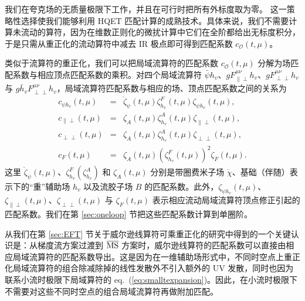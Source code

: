 我们在夸克场的无质量极限下工作，并且在可行时把所有外标度取为零。
这一策略性选择使我们能够利用 HQET 匹配计算的成熟技术。具体来说，我们不需要计算未流动的算符，因为在维数正则化的微扰计算中它们在全阶都给出无标度积分，于是只需从重正化的流动算符中减去 IR 极点即可得到匹配系数 $c_{\mathcal{O}}(t, \mu)$。

类似于流算符的重正化，我们可以把局域流算符的匹配系数 $c_{\mathcal{O}}(t, \mu)$ 分解为场匹配系数与相应顶点匹配系数的乘积。对四个局域流算符 $\bar{\psi} h_v$、$gF^{\mu\nu}_{\|\perp}h_v$、$gF^{\mu\nu}_{\perp\perp}h_v$ 与 $g\bar{h}_vF^{\mu\nu}_{\perp\perp}h_v$，局域流算符匹配系数与相应的场、顶点匹配系数之间的关系为
\begin{subequations}
\label{eq:operatorrelations}
\begin{eqnarray}
c_{\psi h_v} (t,\mu) &=& \mathring{\zeta}_{\psi}(t,\mu)\zeta_{h_v}^F(t,\mu)\zeta_{\psi h_v}(t,\mu),\\
c_{\|\perp} (t,\mu)&=& \zeta_{A}(t,\mu)\zeta_{h_v}^A(t,\mu)\zeta_{\|\perp}(t,\mu),\\
c_{\perp\perp}(t,\mu) &=& \zeta_{A}(t,\mu)\zeta_{h_v}^A(t,\mu)\zeta_{\perp\perp}(t,\mu),\\
c_F(t,\mu) &=& \zeta_{A}(t,\mu)(\zeta^F_{h_v}(t,\mu))^2\zeta_F(t,\mu).
\end{eqnarray}
\end{subequations}
这里 $\mathring{\zeta}_{\psi}(t,\mu)$、$\zeta_{h_v}^F (\zeta_{h_v}^A)$ 和 $\zeta_{A}(t,\mu)$ 分别是带圈费米子场 $\mathring{\chi}$、基础（伴随）表示下的``重''辅助场 $h_v$ 以及流胶子场 $B$ 的匹配系数。此外，$\zeta_{\psi h_v}(t,\mu)$、$\zeta_{\|\perp}(t,\mu)$、$\zeta_{\perp\perp}(t,\mu)$ 与 $\zeta_F(t,\mu)$ 表示相应流动局域流算符顶点修正引起的匹配系数。我们在第 \ref{sec:oneloop} 节把这些匹配系数计算到单圈阶。

从我们在第 \ref{sec:EFT} 节关于威尔逊线算符可乘重正化的研究中得到的一个关键认识是：从梯度流方案过渡到 $\overline{\rm MS}$ 方案时，威尔逊线算符的匹配系数可以直接由相应局域流算符的匹配系数导出。这是因为在一维辅助场形式中，不同时空点上重正化局域流算符的组合除减除掉的线性发散外不引入额外的 UV 发散，同时也因为联系小流时极限下局域算符的 eq.~(\ref{eq:smalltexpansion})。因此，在小流时极限下不需要对这些不同时空点的组合局域流算符再做附加匹配。
